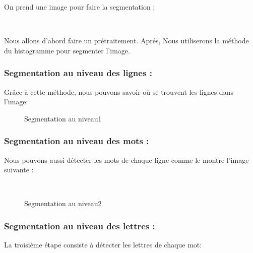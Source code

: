 {On prend une image pour faire la segmentation :
\begin{figure}[H] 
\centering
{}\\[0.5cm]
\end{figure}
Nous allons d'abord faire un prétraitement. Aprés, Nous utiliserons la méthode du histogramme pour segmenter l'image.

\subsubsection*{Segmentation au niveau des lignes :}
Grâce à cette méthode, nous pouvons savoir où se trouvent les lignes dans l'image:



\begin{figure}[H]
    \centering
    \qquad
    \caption{Segmentation au niveau1}
    \label{fig:example}
\end{figure}


\subsubsection*{Segmentation au niveau des mots :}
Nous pouvons aussi détecter les mots de chaque ligne comme le montre l'image suivante :

\begin{figure}[H] 
\centering
{}\\[0.5cm]
\caption{Segmentation au niveau2}
\label{fig:figure20}
\end{figure}

\subsubsection*{Segmentation au niveau des lettres :}
La troisième étape consiste à détecter les lettres de chaque mot:

}
